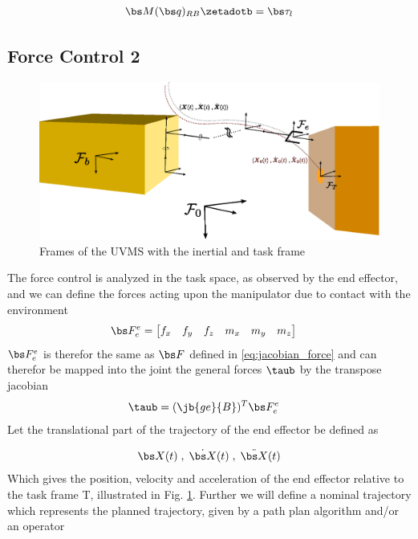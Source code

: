 \begin{align}
	\bs M(\bs q)_{RB}\zetadotb = \bs \tau_l
	\label{eq:linearized_feedback}
\end{align}








\subsection{Force Control 2}
\begin{figure}[h!]
	\centering
	\includegraphics[scale=0.7]{./figures/uvms_kinematics_force.eps}
	\caption{Frames of the UVMS with the inertial and task frame}
	\label{fig:uvms_force}
\end{figure}
The force control is analyzed in the task space, as observed by the end effector, and we can define the forces acting upon the manipulator due to contact with the environment 
\begin{align}
	\bs F_e^e&=\begin{bmatrix} f_x & f_y & f_z & m_x & m_y & m_z \end{bmatrix}
	\label{eq:force_force}
\end{align}
$\bs F_e^e$ is therefor the same as $\bs F$ defined in \eqref{eq:jacobian_force} and can therefor be mapped into the joint the general forces $\taub$ by the transpose jacobian
\begin{align}
	\taub&=(\jb{ge}{B})^T\bs F_e^e
	\label{eq:jacobian-force2}
\end{align}
Let the translational part of the trajectory of the end effector be defined as

\begin{align}
	\bs X(t) \; , \; \dot{\bs X}(t)\; , \; \ddot{\bs X}(t)	
	\label{eq:ee_traj}
\end{align}
Which gives the position, velocity and acceleration of the end effector relative to the task frame \frame T, illustrated in Fig. \ref{fig:uvms_force}. Further we will define a nominal trajectory which represents the planned 
trajectory, given by a path plan algorithm and/or an operator

